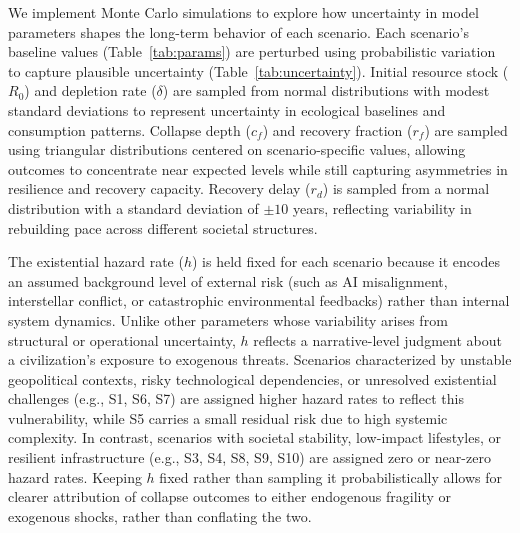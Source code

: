 We implement Monte Carlo simulations to explore how uncertainty in model parameters shapes the long-term behavior of each scenario. Each scenario's baseline values (Table~\ref{tab:params}) are perturbed using probabilistic variation to capture plausible uncertainty (Table~\ref{tab:uncertainty}). Initial resource stock (\(R_{0}\)) and depletion rate (\(\delta\)) are sampled from normal distributions with modest standard deviations to represent uncertainty in ecological baselines and consumption patterns. Collapse depth (\(c_{f}\)) and recovery fraction (\(r_{f}\)) are sampled using triangular distributions centered on scenario-specific values, allowing outcomes to concentrate near expected levels while still capturing asymmetries in resilience and recovery capacity. Recovery delay (\(r_{d}\)) is sampled from a normal distribution with a standard deviation of $\pm 10$ years, reflecting variability in rebuilding pace across different societal structures.

The existential hazard rate (\(h\)) is held fixed for each scenario because it encodes an assumed background level of external risk (such as AI misalignment, interstellar conflict, or catastrophic environmental feedbacks) rather than internal system dynamics. Unlike other parameters whose variability arises from structural or operational uncertainty, \(h\) reflects a narrative-level judgment about a civilization's exposure to exogenous threats. Scenarios characterized by unstable geopolitical contexts, risky technological dependencies, or unresolved existential challenges (e.g., S1, S6, S7) are assigned higher hazard rates to reflect this vulnerability, while S5 carries a small residual risk due to high systemic complexity. In contrast, scenarios with societal stability, low-impact lifestyles, or resilient infrastructure (e.g., S3, S4, S8, S9, S10) are assigned zero or near-zero hazard rates. Keeping \(h\) fixed rather than sampling it probabilistically allows for clearer attribution of collapse outcomes to either endogenous fragility or exogenous shocks, rather than conflating the two.

